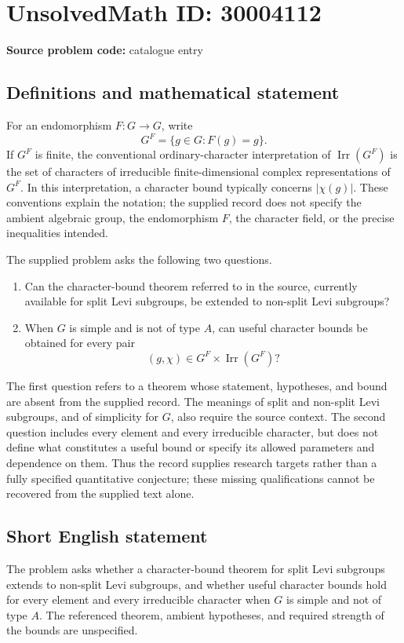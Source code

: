 \documentclass[11pt]{article}
\begin{document}
\section*{UnsolvedMath ID: 30004112}
\textbf{Source problem code:} catalogue entry
\subsection{Definitions and mathematical statement}
For an endomorphism \(F:G\to G\), write
\[
G^F=\{g\in G:F(g)=g\}.
\]
If \(G^F\) is finite, the conventional ordinary-character interpretation of \(\operatorname{Irr}(G^F)\) is the set of characters of irreducible finite-dimensional complex representations of \(G^F\). In this interpretation, a character bound typically concerns \(\lvert\chi(g)\rvert\). These conventions explain the notation; the supplied record does not specify the ambient algebraic group, the endomorphism \(F\), the character field, or the precise inequalities intended.

The supplied problem asks the following two questions.
\begin{enumerate}
\item Can the character-bound theorem referred to in the source, currently available for split Levi subgroups, be extended to non-split Levi subgroups?
\item When \(G\) is simple and is not of type \(A\), can useful character bounds be obtained for every pair
\[
(g,\chi)\in G^F\times\operatorname{Irr}(G^F)?
\]
\end{enumerate}
The first question refers to a theorem whose statement, hypotheses, and bound are absent from the supplied record. The meanings of split and non-split Levi subgroups, and of simplicity for \(G\), also require the source context. The second question includes every element and every irreducible character, but does not define what constitutes a useful bound or specify its allowed parameters and dependence on them. Thus the record supplies research targets rather than a fully specified quantitative conjecture; these missing qualifications cannot be recovered from the supplied text alone.
\subsection{Short English statement}
The problem asks whether a character-bound theorem for split Levi subgroups extends to non-split Levi subgroups, and whether useful character bounds hold for every element and every irreducible character when \(G\) is simple and not of type \(A\). The referenced theorem, ambient hypotheses, and required strength of the bounds are unspecified.
\end{document}
